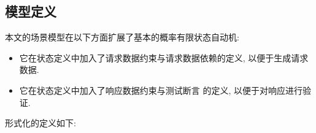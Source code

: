         \subsection{模型定义}
            本文的场景模型在以下方面扩展了基本的概率有限状态自动机:
            
            \begin{itemize}
                \item 它在状态定义中加入了请求数据约束与请求数据依赖的定义, 以便于生成请求数据.
                
                \item 它在状态定义中加入了响应数据约束与测试断言 的定义, 以便于对响应进行验证.
            \end{itemize}
            
            形式化的定义如下:
            
